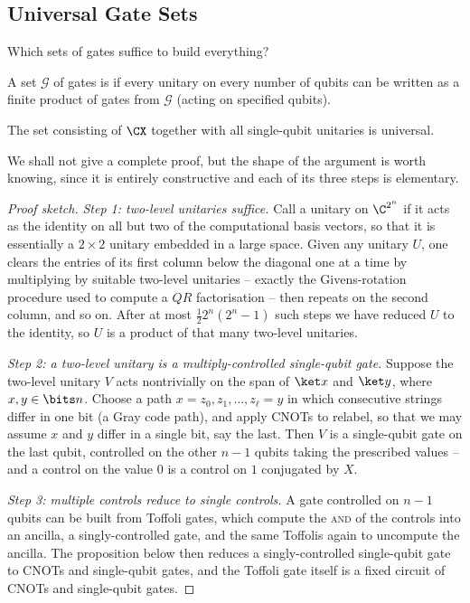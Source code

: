 \subsection{Universal Gate Sets}

Which sets of gates suffice to build everything?

\begin{definition}
	A set $\mathcal G$ of gates is  if every unitary on every number of qubits can be written as a finite product of gates from $\mathcal G$ (acting on specified qubits).
\end{definition}

\begin{theorem}
	The set consisting of $\CX$ together with all single-qubit unitaries is universal.
\end{theorem}

We shall not give a complete proof, but the shape of the argument is worth knowing, since it is entirely constructive and each of its three steps is elementary.

\begin{proof}[Proof sketch]
	\emph{Step 1: two-level unitaries suffice.} Call a unitary on $\C^{2^n}$  if it acts as the identity on all but two of the computational basis vectors, so that it is essentially a $2\times2$ unitary embedded in a large space. Given any unitary $U$, one clears the entries of its first column below the diagonal one at a time by multiplying by suitable two-level unitaries -- exactly the Givens-rotation procedure used to compute a $QR$ factorisation -- then repeats on the second column, and so on. After at most $\tfrac12 2^n(2^n-1)$ such steps we have reduced $U$ to the identity, so $U$ is a product of that many two-level unitaries.

	\emph{Step 2: a two-level unitary is a multiply-controlled single-qubit gate.} Suppose the two-level unitary $V$ acts nontrivially on the span of $\ket x$ and $\ket y$, where $x,y\in\bits n$. Choose a path $x = z_0, z_1,\dots,z_\ell = y$ in which consecutive strings differ in one bit (a Gray code path), and apply CNOTs to relabel, so that we may assume $x$ and $y$ differ in a single bit, say the last. Then $V$ is a single-qubit gate on the last qubit, controlled on the other $n-1$ qubits taking the prescribed values -- and a control on the value $0$ is a control on $1$ conjugated by $X$.

	\emph{Step 3: multiple controls reduce to single controls.} A gate controlled on $n-1$ qubits can be built from Toffoli gates, which compute the \textsc{and} of the controls into an ancilla, a singly-controlled gate, and the same Toffolis again to uncompute the ancilla. The proposition below then reduces a singly-controlled single-qubit gate to CNOTs and single-qubit gates, and the Toffoli gate itself is a fixed circuit of CNOTs and single-qubit gates.
\end{proof}

